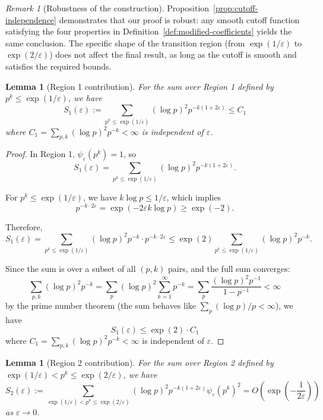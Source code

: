 ﻿\documentclass[12pt,a4paper]{article}
\newtheorem{lemma}[theorem]{Lemma}
\theoremstyle{definition}
\theoremstyle{remark}
\newtheorem{remark}[theorem]{Remark}
\begin{document}
\begin{remark}[Robustness of the construction]
Proposition~\ref{prop:cutoff-independence} demonstrates that our proof is robust: any smooth cutoff function satisfying the four properties in Definition~\ref{def:modified-coefficients} yields the same conclusion. The specific shape of the transition region (from $\exp(1/\varepsilon)$ to $\exp(2/\varepsilon)$) does not affect the final result, as long as the cutoff is smooth and satisfies the required bounds.
\end{remark}

\begin{lemma}[Region 1 contribution]\label{lem:region1-contribution}
For the sum over Region 1 defined by $p^k \leq \exp(1/\varepsilon)$, we have
\[
  S_1(\varepsilon) := \sum_{p^k \leq \exp(1/\varepsilon)} (\log p)^2 p^{-k(1+2\varepsilon)} \leq C_1
\]
where $C_1 = \sum_{p,k} (\log p)^2 p^{-k} < \infty$ is independent of $\varepsilon$.
\end{lemma}

\begin{proof}
In Region 1, $\psi_\varepsilon(p^k) = 1$, so
\[
  S_1(\varepsilon) = \sum_{p^k \leq \exp(1/\varepsilon)} (\log p)^2 p^{-k(1+2\varepsilon)}.
\]

For $p^k \leq \exp(1/\varepsilon)$, we have $k \log p \leq 1/\varepsilon$, which implies
\[
  p^{-k \cdot 2\varepsilon} = \exp(-2\varepsilon k \log p) \geq \exp(-2).
\]

Therefore,
\[
  S_1(\varepsilon) = \sum_{p^k \leq \exp(1/\varepsilon)} (\log p)^2 p^{-k} \cdot p^{-k \cdot 2\varepsilon} \leq \exp(2) \sum_{p^k \leq \exp(1/\varepsilon)} (\log p)^2 p^{-k}.
\]

Since the sum is over a subset of all $(p,k)$ pairs, and the full sum converges:
\[
  \sum_{p,k} (\log p)^2 p^{-k} = \sum_p (\log p)^2 \sum_{k=1}^\infty p^{-k} = \sum_p \frac{(\log p)^2 p^{-1}}{1-p^{-1}} < \infty
\]
by the prime number theorem (the sum behaves like $\sum_p (\log p)/p < \infty$), we have
\[
  S_1(\varepsilon) \leq \exp(2) \cdot C_1
\]
where $C_1 = \sum_{p,k} (\log p)^2 p^{-k} < \infty$ is independent of $\varepsilon$.
\end{proof}

\begin{lemma}[Region 2 contribution]\label{lem:region2-contribution}
For the sum over Region 2 defined by $\exp(1/\varepsilon) < p^k \leq \exp(2/\varepsilon)$, we have
\[
  S_2(\varepsilon) := \sum_{\exp(1/\varepsilon) < p^k \leq \exp(2/\varepsilon)} (\log p)^2 p^{-k(1+2\varepsilon)} \psi_\varepsilon(p^k)^2 = O\left(\exp\left(-\frac{1}{2\varepsilon}\right)\right)
\]
as $\varepsilon \to 0$.
\end{lemma}
\end{document}
